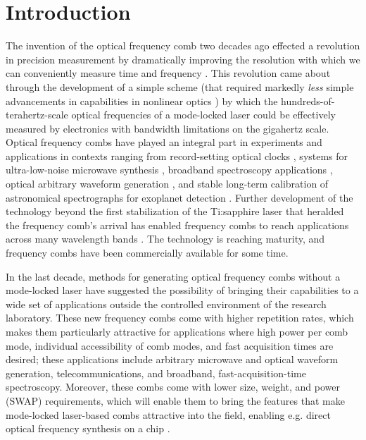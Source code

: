  \chapter{Introduction}
\label{ch:intro}

The invention of the optical frequency comb two decades ago effected a revolution in precision measurement by dramatically improving the resolution with which we can conveniently measure time and frequency \cite{Diddams2000,Jones2000,Udem2002,Hall2006,Hansch2006}. This revolution came about through the development of a simple scheme (that required markedly \textit{less} simple advancements in capabilities in nonlinear optics \cite{Ranka2000}) by which the hundreds-of-terahertz-scale optical frequencies of a mode-locked laser could be effectively measured by electronics with bandwidth limitations on the gigahertz scale. Optical frequency combs have played an integral part in experiments and applications in contexts ranging from record-setting optical clocks \cite{Diddams2001}, systems for ultra-low-noise microwave synthesis \cite{Fortier2011}, broadband spectroscopy applications \cite{Diddams2007,Coddington2016}, optical arbitrary waveform generation \cite{Cundiff2010}, and stable long-term calibration of astronomical spectrographs for exoplanet detection \cite{Steinmetz2008}. Further development of the technology beyond the first stabilization of the Ti:sapphire laser that heralded the frequency comb's arrival has enabled frequency combs to reach applications across many wavelength bands \cite{Diddams2010,Gohle2005b,Faist2016}. The technology is reaching maturity, and frequency combs have been commercially available for some time.

In the last decade, methods for generating optical frequency combs without a mode-locked laser have suggested the possibility of bringing their capabilities to a wide set of applications outside the controlled environment of the research laboratory. These new frequency combs come with higher repetition rates, which makes them particularly attractive for applications where high power per comb mode, individual accessibility of comb modes, and fast acquisition times are desired; these applications include arbitrary microwave and optical waveform generation, telecommunications, and broadband, fast-acquisition-time spectroscopy. Moreover, these combs come with lower size, weight, and power (SWAP) requirements, which will enable them to bring the features that make mode-locked laser-based combs attractive into the field, enabling e.g. direct optical frequency synthesis on a chip \cite{Spencer2018}.

